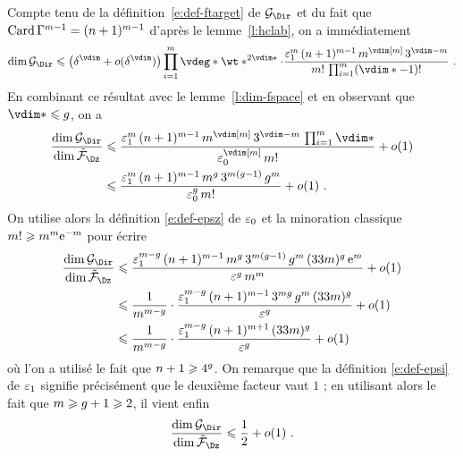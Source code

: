 Compte tenu de la définition~\eqref{e:def-ftarget} de \( \ftarget \) et du fait
que \( \operatorname{Card} \Gamma^{m-1} = (n + 1)^{m-1} \) d'après le
lemme~\ref{l:hclab}, on a immédiatement
\begin{equation}
  \dim \ftarget
  \le
  \bigl(\delta^\vdim + o(\delta^\vdim)\bigr)
  \prod\fctrange \vdeg* \wt*^{2\vdim*}
  \cdot
  \frac {
    \epsi^\puiss
    \, (\dimp + 1)^{\puiss-1}
    \, \puiss^{\vdim[\puiss]}
    \, 3^{\vdim - \puiss}
  }{
    \puiss!
    \, \prod\fctrange (\vdim* - 1)!
  }
  \pmm.
\end{equation}
En combinant ce résultat avec le lemme~\ref{l:dim-fspace} et en observant que
\( \vdim* \le \genre \), on a
\begin{align}
  \frac {\dim \ftarget} {\dim \fspace}
  & \le
  \frac {
    \epsi^\puiss
    \, (\dimp + 1)^{\puiss-1}
    \, \puiss^{\vdim[\puiss]}
    \, 3^{\vdim - \puiss}
    \, \prod\fctrange \vdim*
  }{
    \epsz^{\vdim[\puiss]}
    \, \puiss!
  }
  + o(1)
  \\ & \le
  \frac {
    \epsi^\puiss
    \, (\dimp + 1)^{\puiss-1}
    \, \puiss ^{\genre}
    \, 3 ^{\puiss (\genre-1)}
    \, \genre^\puiss
  }{
    \epsz^\genre
    \, \puiss!
  }
  + o(1)
  \pmm.
\end{align}
On utilise alors la définition \eqref{e:def-epsz} de \( \varepsilon\sb0 \) et la
minoration classique \( m! \geqslant m^m \mathrm e^{-m} \) pour
écrire
\begin{align}
  \frac {\dim \ftarget} {\dim \fspace}
  & \le
  \frac {
    \epsi^{\puiss-\genre}
    \, (\dimp + 1)^{\puiss-1}
    \, \puiss ^{\genre}
    \, 3 ^{\puiss (\genre-1)}
    \, \genre^\puiss
    \, (33\puiss)^\genre
    \, \expb^\puiss
  }{
    \eps^\genre
    \, \puiss^\puiss
  }
  + o(1)
  \\ & \le
  \frac 1 { \puiss^{\puiss-\genre} }
  \cdot
  \frac {
    \epsi^{\puiss-\genre}
    \, (\dimp + 1)^{\puiss-1}
    \, 3 ^{\puiss \genre}
    \, \genre^\puiss
    \, (33\puiss)^\genre
  }{
    \eps^\genre
  }
  + o(1)
  \\ & \le
  \frac 1 { \puiss^{\puiss-\genre} }
  \cdot
  \frac {
    \epsi^{\puiss-\genre}
    \, (\dimp + 1)^{\puiss+1}
    \, (33\puiss)^\genre
  }{
    \eps^\genre
  }
  + o(1)
\end{align}
où l'on a utilisé le fait que \( n + 1 \geqslant 4^g \).  On remarque que
la définition \eqref{e:def-epsi} de \( \varepsilon\sb1 \) signifie précisément que le
deuxième facteur vaut \( 1 \) ; en utilisant alors le fait que \( m \geqslant
  g + 1 \geqslant 2 \), il vient enfin
\begin{equation} \label{e:good-codim}
  \frac {\dim \ftarget} {\dim \fspace}
  \le
  \frac12
  + o(1)
  \pmm.
\end{equation}


